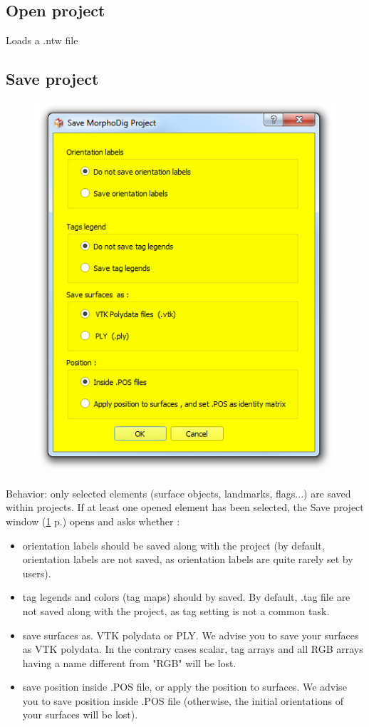 \subsection{Open project}
Loads a .ntw file

\subsection{Save project}
\begin{figure}
  \centering  
 \includegraphics[scale=0.5]{images/07/project/save_ntw.png}
\label{save_project_file}
\end{figure}
Behavior: only selected elements (surface objects, landmarks, flags...) are saved within projects. If at least one opened element has been selected, the Save project window (\ref{save_project_file} p.\pageref{save_project_file}) opens and asks whether :  
\begin{itemize}
\item orientation labels should be saved along with the project (by default, orientation labels are not saved, as orientation labels are quite rarely set by users). 
\item tag legends and colors (tag maps) should by saved. By default, .tag file are not saved along with the project, as tag setting is not a common task. 
\item save surfaces as. VTK polydata or PLY. We advise you to save your surfaces as VTK polydata. In the contrary cases scalar,  tag arrays and all RGB arrays having a name different from "RGB" will be lost.
\item save position inside .POS file, or apply the position to surfaces. We advise you to save position inside .POS file (otherwise, the initial orientations of your surfaces will be lost). 
\end{itemize}

